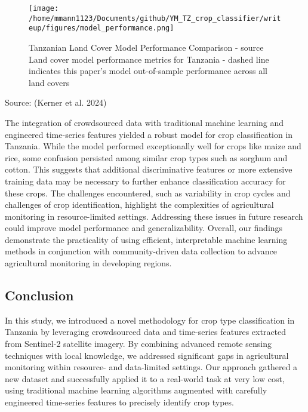 \documentclass[
]{article}
\begin{document}
\begin{figure}[H]
  \centering
  \texttt{[image: /home/mmann1123/Documents/github/YM\_TZ\_crop\_classifier/writeup/figures/model\_performance.png]}  
    \caption{Tanzanian Land Cover Model Performance Comparison - source  \newline Land cover model performance metrics for Tanzania - dashed line indicates this paper’s model out-of-sample performance across all land covers}
    \label{fig:model_compare} %
\end{figure}

Source: (Kerner et al. 2024)

The integration of crowdsourced data with traditional machine learning
and engineered time-series features yielded a robust model for crop
classification in Tanzania. While the model performed exceptionally well
for crops like maize and rice, some confusion persisted among similar
crop types such as sorghum and cotton. This suggests that additional
discriminative features or more extensive training data may be necessary
to further enhance classification accuracy for these crops. The
challenges encountered, such as variability in crop cycles and
challenges of crop identification, highlight the complexities of
agricultural monitoring in resource-limited settings. Addressing these
issues in future research could improve model performance and
generalizability. Overall, our findings demonstrate the practicality of
using efficient, interpretable machine learning methods in conjunction
with community-driven data collection to advance agricultural monitoring
in developing regions.

\hypertarget{conclusion}{%
\subsection{Conclusion}\label{conclusion}}

In this study, we introduced a novel methodology for crop type
classification in Tanzania by leveraging crowdsourced data and
time-series features extracted from Sentinel-2 satellite imagery. By
combining advanced remote sensing techniques with local knowledge, we
addressed significant gaps in agricultural monitoring within resource-
and data-limited settings. Our approach gathered a new dataset and
successfully applied it to a real-world task at very low cost, using
traditional machine learning algorithms augmented with carefully
engineered time-series features to precisely identify crop types.
\end{document}
